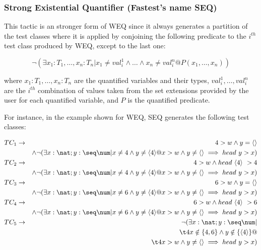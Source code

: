 \subsubsection{\label{seq}Strong Existential Quantifier (Fastest's name SEQ)}
This tactic is an stronger form of WEQ since it always generates a partition of the test classes where it is applied by conjoining the following predicate to the $i^{th}$ test class produced by WEQ, except to the last one: 

\[
\lnot (\exists x_{1}: T_{1}, \dots, x_{n}: T_{n} | x_{1} \neq val^{1}_{i} \land \dots \land x_{n} \neq val^{n}_{i} @ P(x_{1}, \dots , x_{n}))
\]

\noindent where $x_{1}:T_{1}, \dots, x_{n}:T_{n}$ are the quantified variables and their types, $val^{1}_{i}, \dots, val^{n}_{i}$ are the $i^{th}$ combination of values taken from the set extensions provided by the user for each quantified variable, and $P$ is the quantified predicate.

For instance, in the example shown for WEQ, SEQ generates the following test classes:


\begin{eqnarray*}
TC_{1} &\rightarrow& 4 > w \land y = \langle \rangle \\
       & & \land \lnot (\exists x: \nat; y: \seq \num | 
                   x \neq 4 \land y \neq \langle 4 \rangle @ 
                   x > w \land y \neq \langle \rangle \implies head~y > x) \\
TC_{2} &\rightarrow& 4 > w \land head~\langle 4 \rangle\ > 4 \\
       & & \land \lnot (\exists x: \nat; y: \seq \num | 
                   x \neq 4 \land y \neq \langle 4 \rangle @ 
                   x > w \land y \neq \langle \rangle \implies head~y > x) \\
TC_{3} &\rightarrow& 6 > w \land y = \langle \rangle \\
       & & \land \lnot (\exists x: \nat; y: \seq \num | 
                   x \neq 6 \land y \neq \langle 4 \rangle @ 
                   x > w \land y \neq \langle \rangle \implies head~y > x) \\
TC_{4} &\rightarrow& 6 > w \land head~\langle 4 \rangle\ > 6 \\
       & & \land \lnot (\exists x: \nat; y: \seq \num | 
                   x \neq 6 \land y \neq \langle 4 \rangle @ 
                   x > w \land y \neq \langle \rangle \implies head~y > x) \\
TC_{5} &\rightarrow& \lnot (\exists x: \nat; y: \seq \num | \\
  & & \t4 x \notin \{4, 6\} \land y \notin \{\langle 4 \rangle\} @ \\
  & & \t4 x > w \land y \neq \langle \rangle \implies head~y > x)
\end{eqnarray*}


